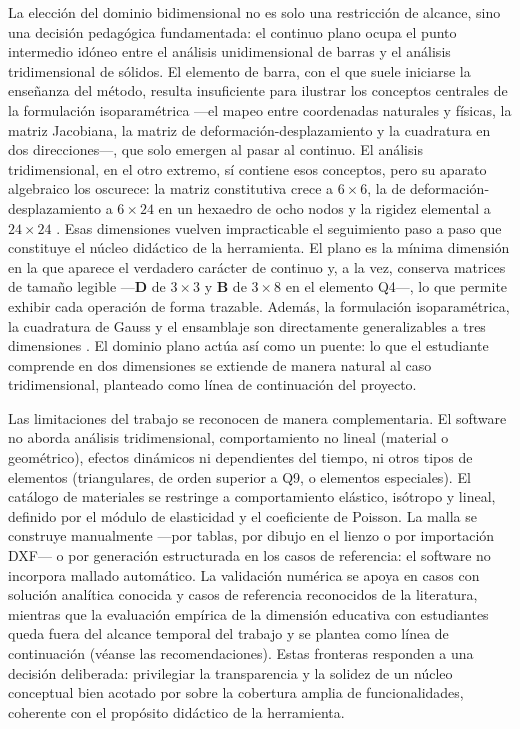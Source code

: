 La elección del dominio bidimensional no es solo una restricción de alcance, sino una decisión pedagógica fundamentada: el continuo plano ocupa el punto intermedio idóneo entre el análisis unidimensional de barras y el análisis tridimensional de sólidos. El elemento de barra, con el que suele iniciarse la enseñanza del método, resulta insuficiente para ilustrar los conceptos centrales de la formulación isoparamétrica —el mapeo entre coordenadas naturales y físicas, la matriz Jacobiana, la matriz de deformación-desplazamiento y la cuadratura en dos direcciones—, que solo emergen al pasar al continuo. El análisis tridimensional, en el otro extremo, sí contiene esos conceptos, pero su aparato algebraico los oscurece: la matriz constitutiva crece a $6\times6$, la de deformación-desplazamiento a $6\times24$ en un hexaedro de ocho nodos y la rigidez elemental a $24\times24$ \autocite[p.~218]{cook2002concepts}. Esas dimensiones vuelven impracticable el seguimiento paso a paso que constituye el núcleo didáctico de la herramienta. El plano es la mínima dimensión en la que aparece el verdadero carácter de continuo y, a la vez, conserva matrices de tamaño legible —$\bm{D}$ de $3\times3$ y $\bm{B}$ de $3\times8$ en el elemento Q4—, lo que permite exhibir cada operación de forma trazable. Además, la formulación isoparamétrica, la cuadratura de Gauss y el ensamblaje son directamente generalizables a tres dimensiones \autocite{bathe2014fem,zienkiewicz2013fem}. El dominio plano actúa así como un puente: lo que el estudiante comprende en dos dimensiones se extiende de manera natural al caso tridimensional, planteado como línea de continuación del proyecto.

Las limitaciones del trabajo se reconocen de manera complementaria. El software no aborda análisis tridimensional, comportamiento no lineal (material o geométrico), efectos dinámicos ni dependientes del tiempo, ni otros tipos de elementos (triangulares, de orden superior a Q9, o elementos especiales). El catálogo de materiales se restringe a comportamiento elástico, isótropo y lineal, definido por el módulo de elasticidad y el coeficiente de Poisson. La malla se construye manualmente —por tablas, por dibujo en el lienzo o por importación DXF— o por generación estructurada en los casos de referencia: el software no incorpora mallado automático. La validación numérica se apoya en casos con solución analítica conocida y casos de referencia reconocidos de la literatura, mientras que la evaluación empírica de la dimensión educativa con estudiantes queda fuera del alcance temporal del trabajo y se plantea como línea de continuación (véanse las recomendaciones). Estas fronteras responden a una decisión deliberada: privilegiar la transparencia y la solidez de un núcleo conceptual bien acotado por sobre la cobertura amplia de funcionalidades, coherente con el propósito didáctico de la herramienta.

